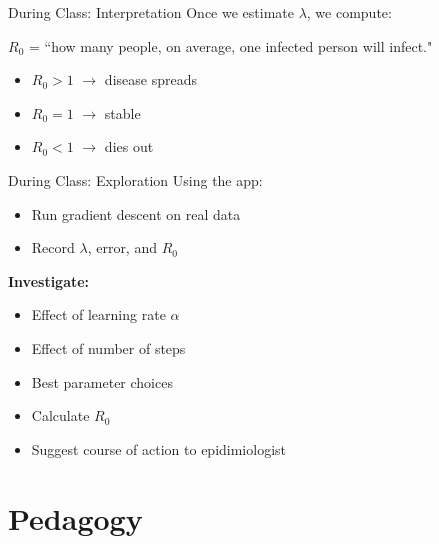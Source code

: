 \documentclass[dvipsnames]{beamer}
\begin{document}

\begin{frame}{During Class: Interpretation}
Once we estimate $\lambda$, we compute:

$R_0$  = ``how many people, on average, one infected person will infect." 




\begin{itemize}
    \item $R_0 > 1$ $\rightarrow$ disease spreads
    \item $R_0 = 1$ $\rightarrow$ stable
    \item $R_0 < 1$ $\rightarrow$ dies out
\end{itemize}

\end{frame}


\begin{frame}{During Class: Exploration}
Using the app:
\begin{itemize}
    \item Run gradient descent on real data
    \item Record $\lambda$, error, and $R_0$
\end{itemize}



\textbf{Investigate:}
\begin{itemize}
    \item Effect of learning rate $\alpha$
    \item Effect of number of steps
    \item Best parameter choices
    \item Calculate $R_0$ 
    \item Suggest course of action to epidimiologist
\end{itemize}

\end{frame}







\section{Pedagogy}
\end{document}
